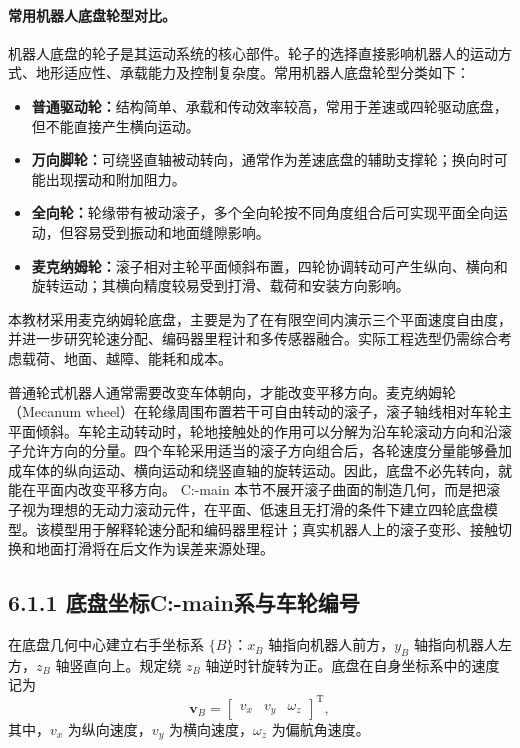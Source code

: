 \documentclass[UTF8,zihao=-4]{ctexart}
\newcommand{\vect}[1]{\bm{#1}}
\begin{document}
\paragraph{常用机器人底盘轮型对比。}

机器人底盘的轮子是其运动系统的核心部件。轮子的选择直接影响机器人的运动方式、地形适应性、承载能力及控制复杂度。常用机器人底盘轮型分类如下：
\begin{itemize}
  \item \textbf{普通驱动轮：}结构简单、承载和传动效率较高，常用于差速或四轮驱动底盘，但不能直接产生横向运动。
  \item \textbf{万向脚轮：}可绕竖直轴被动转向，通常作为差速底盘的辅助支撑轮；换向时可能出现摆动和附加阻力。
  \item \textbf{全向轮：}轮缘带有被动滚子，多个全向轮按不同角度组合后可实现平面全向运动，但容易受到振动和地面缝隙影响。
  \item \textbf{麦克纳姆轮：}滚子相对主轮平面倾斜布置，四轮协调转动可产生纵向、横向和旋转运动；其横向精度较易受到打滑、载荷和安装方向影响。
\end{itemize}

本教材采用麦克纳姆轮底盘，主要是为了在有限空间内演示三个平面速度自由度，并进一步研究轮速分配、编码器里程计和多传感器融合。实际工程选型仍需综合考虑载荷、地面、越障、能耗和成本。

普通轮式机器人通常需要改变车体朝向，才能改变平移方向。麦克纳姆轮（Mecanum wheel）在轮缘周围布置若干可自由转动的滚子，滚子轴线相对车轮主平面倾斜。车轮主动转动时，轮地接触处的作用可以分解为沿车轮滚动方向和沿滚子允许方向的分量。四个车轮采用适当的滚子方向组合后，各轮速度分量能够叠加成车体的纵向运动、横向运动和绕竖直轴的旋转运动。因此，底盘不必先转向，就能在平面内改变平移方向。
C:\Users{}\Desktop{}-main
本节不展开滚子曲面的制造几何，而是把滚子视为理想的无动力滚动元件，在平面、低速且无打滑的条件下建立四轮底盘模型。该模型用于解释轮速分配和编码器里程计；真实机器人上的滚子变形、接触切换和地面打滑将在后文作为误差来源处理。

\subsection*{6.1.1 底盘坐标C:\Users{}\Desktop{}-main系与车轮编号}

在底盘几何中心建立右手坐标系 $\{B\}$：$x_B$ 轴指向机器人前方，$y_B$ 轴指向机器人左方，$z_B$ 轴竖直向上。规定绕 $z_B$ 轴逆时针旋转为正。底盘在自身坐标系中的速度记为
\begin{equation}
  \vect{v}_B =
  \begin{bmatrix}
    v_x & v_y & \omega_z
  \end{bmatrix}^{\mathrm T},
  \label{eq:body-velocity}
\end{equation}
其中，$v_x$ 为纵向速度，$v_y$ 为横向速度，$\omega_z$ 为偏航角速度。
\end{document}
